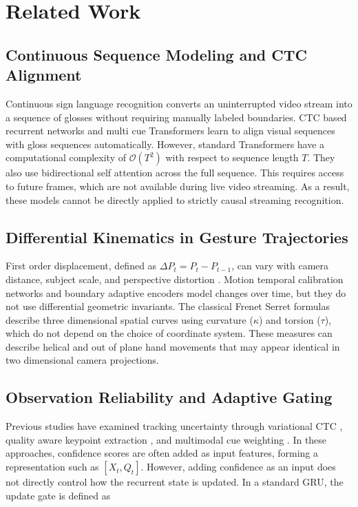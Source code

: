 \documentclass[conference]{IEEEtran}
\begin{document}
\section{Related Work}

\subsection{Continuous Sequence Modeling and CTC Alignment}

Continuous sign language recognition converts an uninterrupted video stream into a sequence of glosses without requiring manually labeled boundaries. CTC based recurrent networks \cite{b8} and multi cue Transformers \cite{b1,b2} learn to align visual sequences with gloss sequences automatically. However, standard Transformers have a computational complexity of $\mathcal{O}(T^2)$ with respect to sequence length $T$. They also use bidirectional self attention across the full sequence. This requires access to future frames, which are not available during live video streaming. As a result, these models cannot be directly applied to strictly causal streaming recognition.

\subsection{Differential Kinematics in Gesture Trajectories}

First order displacement, defined as $\Delta P_t = P_t - P_{t-1}$, can vary with camera distance, subject scale, and perspective distortion \cite{b3,b7}. Motion temporal calibration networks \cite{b3} and boundary adaptive encoders \cite{b7} model changes over time, but they do not use differential geometric invariants. The classical Frenet Serret formulas describe three dimensional spatial curves using curvature ($\kappa$) and torsion ($\tau$), which do not depend on the choice of coordinate system. These measures can describe helical and out of plane hand movements that may appear identical in two dimensional camera projections.

\subsection{Observation Reliability and Adaptive Gating}

Previous studies have examined tracking uncertainty through variational CTC \cite{b4}, quality aware keypoint extraction \cite{b5}, and multimodal cue weighting \cite{b6}. In these approaches, confidence scores are often added as input features, forming a representation such as $[X_t, Q_t]$. However, adding confidence as an input does not directly control how the recurrent state is updated. In a standard GRU, the update gate is defined as
\end{document}
